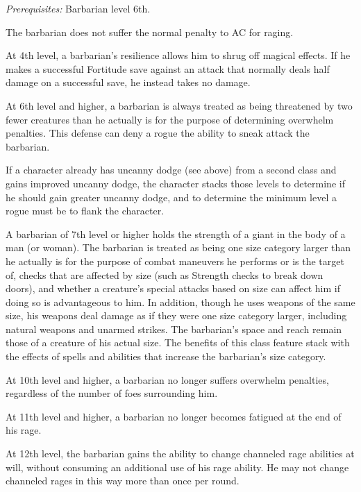 \textit{Prerequisites:} Barbarian level 6th.

 The barbarian does not suffer the normal  penalty to AC for raging.

 At 4th level, a barbarian's resilience allows him to shrug off magical effects. If he makes a successful Fortitude save against an attack that normally deals half damage on a successful save, he instead takes no damage.

 At 6th level and higher, a barbarian is always treated as being threatened by two fewer creatures than he actually is for the purpose of determining overwhelm penalties. This defense can deny a rogue the ability to sneak attack the barbarian.
\par If a character already has uncanny dodge (see above) from a second class and gains improved uncanny dodge, the character stacks those levels to determine if he should gain greater uncanny dodge, and to determine the minimum level a rogue must be to flank the character.

 A barbarian of 7th level or higher holds the strength of a giant in the body of a man (or woman). The barbarian is treated as being one size category larger than he actually is for the purpose of combat maneuvers he performs or is the target of, checks that are affected by size (such as Strength checks to break down doors), and whether a creature's special attacks based on size can affect him if doing so is advantageous to him. In addition, though he uses weapons of the same size, his weapons deal damage as if they were one size category larger, including natural weapons and unarmed strikes. The barbarian's space and reach remain those of a creature of his actual size. The benefits of this class feature stack with the effects of spells and abilities that increase the barbarian's size category.

 At 10th level and higher, a barbarian no longer suffers overwhelm penalties, regardless of the number of foes surrounding him.

 At 11th level and higher, a barbarian no longer becomes fatigued at the end of his rage.

 At 12th level, the barbarian gains the ability to change channeled rage abilities at will, without consuming an additional use of his rage ability. He may not change channeled rages in this way more than once per round.

